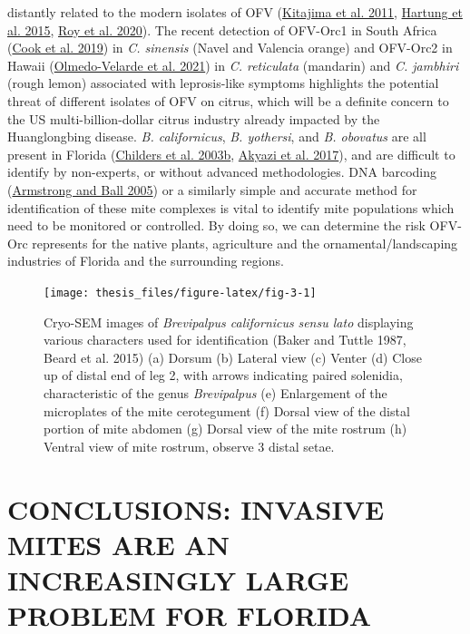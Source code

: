 \documentclass[12pt,final,CPage]{ufthesis}
\begin{document}
{distantly related to the modern isolates of OFV (\protect\hyperlink{ref-Kitajima2011a}{Kitajima et al. 2011}, \protect\hyperlink{ref-Hartung2015}{Hartung et al. 2015}, \protect\hyperlink{ref-Roy2020}{Roy et al. 2020}). The recent detection of OFV-Orc1 in South Africa (\protect\hyperlink{ref-Cook2019}{Cook et al. 2019}) in \emph{C. sinensis} (Navel and Valencia orange) and OFV-Orc2 in Hawaii (\protect\hyperlink{ref-Velarde2021}{Olmedo-Velarde et al. 2021}) in \emph{C. reticulata} (mandarin) and \emph{C. jambhiri} (rough lemon) associated with leprosis-like symptoms highlights the potential threat of different isolates of OFV on citrus, which will be a definite concern to the US multi-billion-dollar citrus industry already impacted by the Huanglongbing disease. \emph{B. californicus}, \emph{B. yothersi}, and \emph{B. obovatus} are all present in Florida (\protect\hyperlink{ref-Childers2003}{Childers et al. 2003b}, \protect\hyperlink{ref-Akyazi2017}{Akyazi et al. 2017}), and are difficult to identify by non-experts, or without advanced methodologies. DNA barcoding (\protect\hyperlink{ref-Armstrong2005}{Armstrong and Ball 2005}) or a similarly simple and accurate method for identification of these mite complexes is vital to identify mite populations which need to be monitored or controlled. By doing so, we can determine the risk OFV-Orc represents for the native plants, agriculture and the ornamental/landscaping industries of Florida and the surrounding regions.
  \begin{figure}

  {\centering \texttt{[image: thesis\_files/figure-latex/fig-3-1]} 

  }

  \caption{Cryo-SEM images of \textit{Brevipalpus californicus} \textit{sensu lato} displaying various characters used for identification (Baker and Tuttle 1987, Beard et al. 2015) (a) Dorsum  (b) Lateral view (c) Venter (d) Close up of distal end of leg 2, with arrows indicating paired solenidia, characteristic of the genus \textit{Brevipalpus} (e) Enlargement of the microplates of the mite cerotegument (f) Dorsal view of the distal portion of mite abdomen (g) Dorsal view of the mite rostrum (h) Ventral view of mite rostrum, observe 3 distal setae.}\label{fig:fig-3}
  \end{figure}
  \hypertarget{conclusions-invasive-mites-are-an-increasingly-large-problem-for-florida}{%
  \chapter{CONCLUSIONS: INVASIVE MITES ARE AN INCREASINGLY LARGE PROBLEM FOR FLORIDA}\label{conclusions-invasive-mites-are-an-increasingly-large-problem-for-florida}}

}
\end{document}
